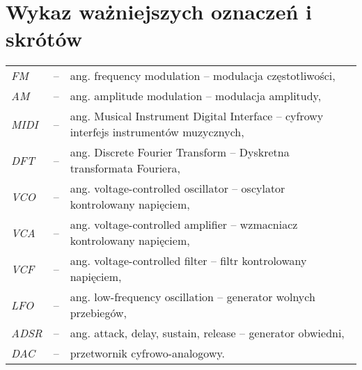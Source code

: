\chapter*{Wykaz ważniejszych oznaczeń i skrótów}

\begin{tabular}{lcl}
	\textit{FM} & -- & ang. frequency modulation -- modulacja częstotliwości, \\
	\textit{AM} & -- & ang. amplitude modulation -- modulacja amplitudy, \\
	\textit{MIDI} & -- & ang. Musical Instrument Digital Interface -- cyfrowy interfejs instrumentów muzycznych, \\
	\textit{DFT} & -- & ang. Discrete Fourier Transform -- Dyskretna transformata Fouriera, \\
	\textit{VCO} & -- & ang. voltage-controlled oscillator -- oscylator kontrolowany napięciem, \\
	\textit{VCA} & -- & ang. voltage-controlled amplifier -- wzmacniacz kontrolowany napięciem, \\
	\textit{VCF} & -- & ang. voltage-controlled filter -- filtr kontrolowany napięciem, \\
	\textit{LFO} & -- & ang. low-frequency oscillation -- generator wolnych przebiegów, \\
	\textit{ADSR} & -- & ang. attack, delay, sustain, release -- generator obwiedni, \\
	\textit{DAC} & -- & przetwornik cyfrowo-analogowy. \\
\end{tabular} 
